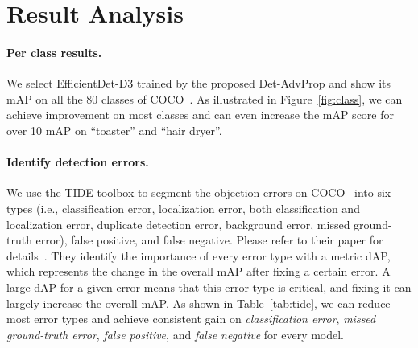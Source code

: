 \documentclass[final]{cvpr}
\begin{document}
\begin{table}[!htb]
\centering
{}
\smallskip
\caption{Comparison (mAP) between Det-AdvProp and baselines on COCO and COCO-C.}
\vspace{-15pt}
\label{tab:compare_adv}
\end{table}



\section{Result Analysis}
\label{app:analysis}
\paragraph{Per class results.}
We select EfficientDet-D3 trained by the proposed Det-AdvProp and show its mAP on all the 80 classes of COCO~\cite{lin2015coco}.
As illustrated in Figure~\ref{fig:class}, we can achieve improvement on most classes and can even increase the mAP score for over 10 mAP on ``toaster'' and ``hair dryer''.

\paragraph{Identify detection errors.}
We use the TIDE toolbox to segment the objection errors on COCO~\cite{lin2015coco} into six types (i.e., classification error, localization error, both classification and localization error, duplicate detection error, background error, missed ground-truth error), false positive, and false negative.
Please refer to their paper for details~\cite{tide-eccv2020}.
They identify the importance of every error type with a metric dAP, which represents the change in the overall mAP after fixing a certain error.
A large dAP for a given error means that this error type is critical, and fixing it can largely increase the overall mAP. 
As shown in Table~\ref{tab:tide}, we can reduce most error types and achieve consistent gain on \textit{classification error}, \textit{missed ground-truth error}, \textit{false positive}, and \textit{false negative} for every model.
\end{document}
